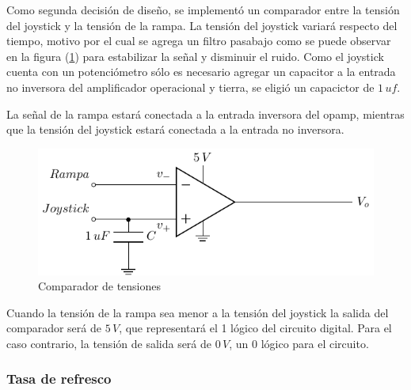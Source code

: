 Como segunda decisión de diseño, se implementó un comparador entre la tensión del joystick y la tensión de la rampa. La tensión del joystick variará respecto del tiempo, motivo por el cual se agrega un filtro pasabajo como se puede observar en la figura (\ref{fig:Comparador}) para estabilizar la señal y disminuir el ruido. Como el joystick cuenta con un potenciómetro sólo es necesario agregar un capacitor  a la entrada no inversora del amplificador operacional y tierra, se eligió un capacictor de $1\,uf$.\par
La señal de la rampa estará conectada a la entrada inversora del opamp, mientras que la tensión del joystick estará conectada a la entrada no inversora.

\begin{figure}[H]
\centering
\includegraphics[scale=0.8]{Ejercicio8/Circuitos/Comparador.pdf}
\caption{Comparador de tensiones}
\label{fig:Comparador}
\end{figure}

Cuando la tensión de la rampa sea menor a la tensión del joystick la salida del comparador será de $5\,V$, que representará el 1 lógico del circuito digital. Para el caso contrario, la tensión de salida será de $0\,V$, un 0 lógico para el circuito.

\subsubsection{Tasa de refresco}


